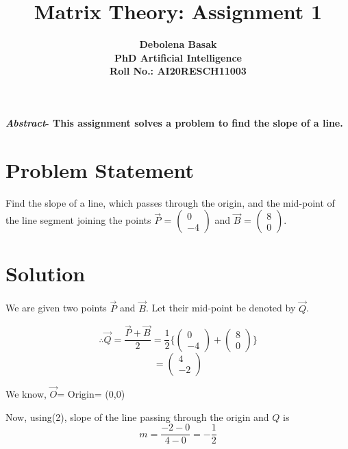 \documentclass{article}
\title{\textbf{Matrix Theory: Assignment 1}}
\author{\textbf{Debolena Basak}\\
\textbf{PhD Artificial Intelligence}\\
\textbf{Roll No.: AI20RESCH11003}}
\date{}
\begin{document}
\maketitle

\textbf{\emph{Abstract}- This assignment solves a problem to find the slope of a line.}

\section{Problem Statement}
Find the slope of a line, which passes through
the origin, and the mid-point of the line segment
joining the points $\Vec{P}$ =
$
\left(\begin{array}{c}
    0\\
    -4
\end{array}\right)
$ and $\Vec{B}$ =
$
\left(\begin{array}{c}
    8\\
    0
\end{array}\right)
$.

\section{Solution}
We are given two points $\Vec{P}$ and $\Vec{B}$. Let their mid-point be denoted by $\vec{Q}$.

\begin{equation*}
    \therefore
    \vec{Q}=\frac{\vec{P}+\vec{B}}{2}
    =\frac{1}{2}\Bigg\{
    \left(\begin{array}{c}
    0\\
    -4
    \end{array}\right)
    +
    \left(\begin{array}{c}
    8\\
    0
    \end{array}\right)\Bigg\}
\end{equation*}
\begin{equation*}
    =\left(\begin{array}{c}
    4\\
    -2
\end{array}\right)
\end{equation*}

We know, $\vec{O}$= Origin= (0,0)

Now, using(2), slope of the line passing through the origin and $Q$ is
\begin{equation*}
    m=\frac{-2-0}{4-0}
    =-\frac{1}{2}
\end{equation*}
\end{document}
